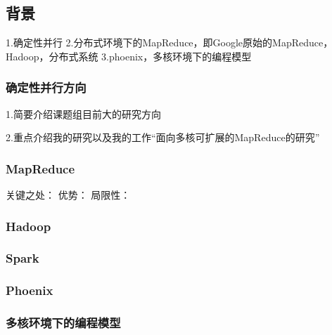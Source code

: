 \subsection{背景}
1.确定性并行
2.分布式环境下的MapReduce，即Google原始的MapReduce，Hadoop，分布式系统
3.phoenix，多核环境下的编程模型

\subsubsection{确定性并行方向}
1.简要介绍课题组目前大的研究方向

2.重点介绍我的研究以及我的工作“面向多核可扩展的MapReduce的研究”

\subsubsection{MapReduce}
关键之处：
优势：
局限性：

\subsubsection{Hadoop}

\subsubsection{Spark}

\subsubsection{Phoenix}

\subsubsection{多核环境下的编程模型}

